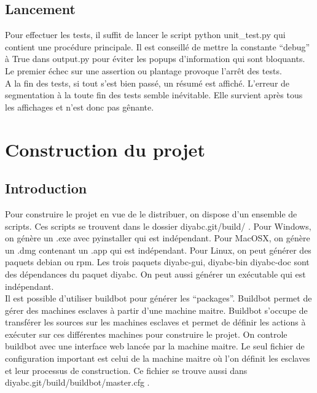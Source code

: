 \documentclass[12pt,a4paper]{article}
\begin{document}
    \subsection{Lancement}
    Pour effectuer les tests, il suffit de lancer le script python unit\_test.py
    qui contient une procédure principale. Il est conseillé de mettre la
    constante ``debug'' à True dans output.py pour éviter les popups
    d'information qui sont bloquants.\\

    Le premier échec sur une assertion ou plantage provoque l'arrêt des tests.\\

    A la fin des tests, si tout s'est bien passé, un résumé est affiché.
    L'erreur de segmentation à la toute fin des tests semble inévitable. Elle
    survient après tous les affichages et n'est donc pas gênante.


\section{Construction du projet}

    \subsection{Introduction}
    Pour construire le projet en vue de le distribuer, on dispose d'un ensemble
    de scripts. Ces scripts se trouvent dans le dossier diyabc.git/build/ .
    Pour Windows, on génère un .exe avec pyinstaller qui est indépendant. Pour
    MacOSX, on génère un .dmg contenant un .app qui est indépendant. Pour Linux,
    on peut générer des paquets debian ou rpm. Les trois paquets diyabc-gui,
    diyabc-bin diyabc-doc sont des dépendances du paquet diyabc. On peut aussi
    générer un exécutable qui est indépendant.\\

    Il est possible d'utiliser buildbot pour générer les ``packages''. 
    Buildbot permet de gérer des machines esclaves à partir d'une machine maitre.
    Buildbot s'occupe de transférer les sources sur les machines esclaves et permet
    de définir les actions à exécuter sur ces différentes machines pour construire
    le projet. On controle buildbot avec une interface web lancée par la machine maitre.
    Le seul fichier de configuration important est celui de la machine maitre où l'on définit
    les esclaves et leur processus de construction. Ce fichier se trouve aussi dans
    diyabc.git/build/buildbot/master.cfg .
\end{document}
